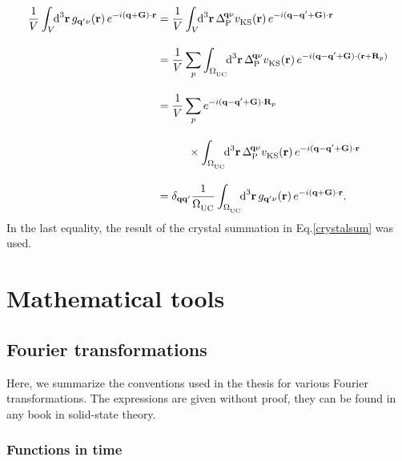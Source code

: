 \begin{equation}\label{blochdelta}
    \begin{aligned}
    \frac{1}{V} \int_V \text{\!\!d}^3\mathbf{r}\, g_{\mathbf{q'}\nu}(\mathbf{r})\,e^{-i(\mathbf{q}+\mathbf{G})\cdot\mathbf{r}} & =  \frac{1}{V} \int_V \text{\!\!d}^3\mathbf{r}\,\Delta_\text{P}^{\!\mathbf{q}\nu}v      ^{\phantom{I}}_\text{KS}(\mathbf{r})\,e^{-i(\mathbf{q-q'+G)\cdot r}}\\[10pt]
     & = \frac{1}{V} \sum_p\int_{\Omega^{\phantom{I}}_\text{UC}} \text{\!\!d}^3\mathbf{r}\,\Delta_\text{P}^{\!\mathbf{q}\nu}v      ^{\phantom{I}}_\text{KS}(\mathbf{r})\,e^{-i(\mathbf{q-q'+G})\cdot(\mathbf{r}+\mathbf{R}_p)}\\[10pt]
     & = \frac{1}{V} \sum_p e^{-i(\mathbf{q-q'+G})\cdot\mathbf{R}_p}\\[10pt] 
     & \phantom{iiiiiiii} \times \int_{\Omega^{\phantom{I}}_\text{UC}}\text{\!\!d}^3\mathbf{r}\,\Delta_\text{P}^{\!\mathbf{q}\nu}v      ^{\phantom{I}}_\text{KS}(\mathbf{r})\,e^{-i\mathbf{(q-q'+G)\cdot r}}\\[10pt]
     & =  \delta_\mathbf{qq'}\frac{1}{\Omega^{\phantom{I}}_\text{UC}} \int_{\Omega^{\phantom{I}}_\text{UC}} \text{\!\!d}^3\mathbf{r}\, g_{\mathbf{q'}\nu}(\mathbf{r})\,e^{-i(\mathbf{q}+\mathbf{G})\cdot\mathbf{r}}.
    \end{aligned}
\end{equation}
%
In the last equality, the result of the crystal summation in Eq.\;\eqref{crystalsum} was used.


\newpage

\phantom{.}
\vspace{3cm}
\section{Mathematical tools}

\subsection{Fourier transformations}
Here, we summarize the conventions used in the thesis for various Fourier transformations. The expressions are given without proof, they can be found in any book in solid-state theory. 

\subsubsection{Functions in time}\label{fourier_time}

